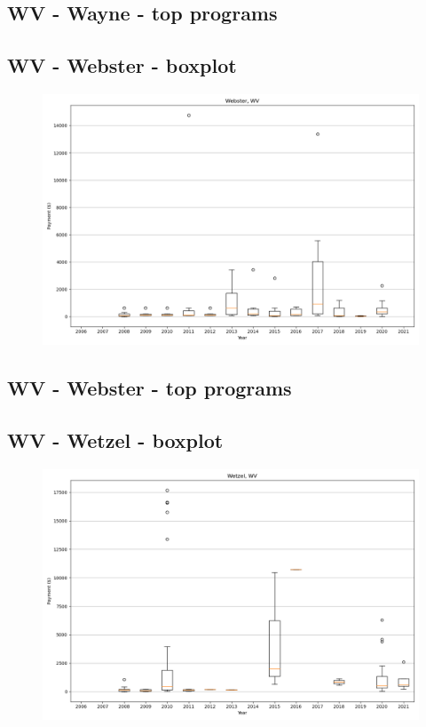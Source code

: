 \subsection*{WV - Wayne - top programs}

\newpage
\subsection*{WV - Webster - boxplot}
\begin{figure}[h]
\centering
\includegraphics[width=7in]{../output/boxplots/counties/Webster-WV_boxplot.png}
\end{figure}


\subsection*{WV - Webster - top programs}

\newpage
\subsection*{WV - Wetzel - boxplot}
\begin{figure}[h]
\centering
\includegraphics[width=7in]{../output/boxplots/counties/Wetzel-WV_boxplot.png}
\end{figure}


